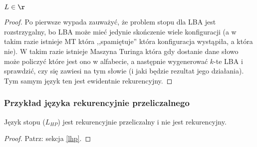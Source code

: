 \begin{lemma}
	\( L \in \r \)
\end{lemma}
\begin{proof}
	Po pierwsze wypada zauważyć, że problem stopu dla LBA jest rozstrzygalny, bo LBA może mieć jedynie skończenie wiele konfiguracji (a w takim razie istnieje MT która ,,spamiętuje'' która konfiguracja wystąpiła, a która nie). W takim razie istnieje Maszyna Turinga która gdy dostanie dane słowo może policzyć które jest ono w alfabecie, a następnie wygenerować \(k\)-te LBA i sprawdzić, czy się zawiesi na tym słowie (i jaki będzie rezultat jego działania). Tym samym język ten jest ewidentnie rekurencyjny.
\end{proof}

\subsubsection{Przykład języka rekurencyjnie przeliczalnego}

\begin{theorem}
	Język stopu (\(L_{HP}\)) jest rekurencyjnie przeliczalny i nie jest rekurencyjny.
\end{theorem}
\begin{proof}
	Patrz: sekcja \ref{lhp}.
\end{proof}